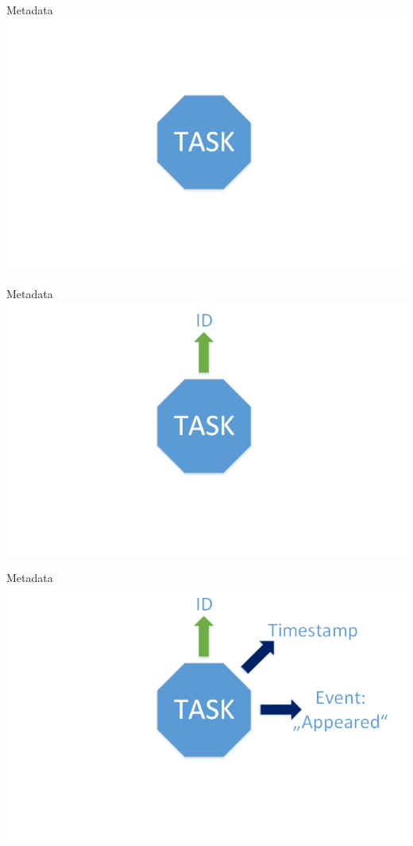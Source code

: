 


	\begin{frame}{Metadata}
	\includegraphics[width=1.0\textwidth]{images/Task/zeichnungstep5.png}
	\end{frame}
	
	\begin{frame}{Metadata}
	\includegraphics[width=1.0\textwidth]{images/Task/zeichnungstep4.png}
	\end{frame}
	
	\begin{frame}{Metadata}
	\includegraphics[width=1.0\textwidth]{images/Task/zeichnungstep3.png}
	\end{frame}
	
